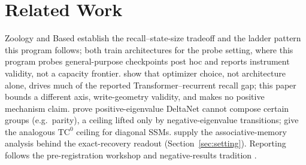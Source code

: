 \section{Related Work}
\label{sec:related}

Zoology \citep{arora2023zoology} and Based \citep{arora2024simple}
establish the recall--state-size tradeoff and the ladder pattern this
program follows; both train architectures for the probe setting, where
this program probes general-purpose checkpoints post hoc and reports
instrument validity, not a capacity frontier.
\citet{okpekpe2025revisiting} show that optimizer choice, not architecture
alone, drives much of the reported Transformer--recurrent recall gap; this
paper bounds a different axis, write-geometry validity, and makes no
positive mechanism claim. \citet{grazzi2024unlocking} prove
positive-eigenvalue DeltaNet cannot compose certain groups (e.g.\ parity),
a ceiling lifted only by negative-eigenvalue transitions;
\citet{merrill2024illusion} give the analogous $\mathrm{TC}^0$ ceiling for
diagonal SSMs.
\citet{nichani2024understanding} supply the associative-memory analysis
behind the exact-recovery readout (Section~\ref{sec:setting}). Reporting
follows the pre-registration workshop \citep{bertinetto2021preface} and
negative-results tradition \citep{forde2020icbinb}.
